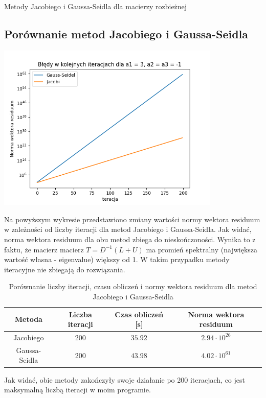\documentclass{article}
\begin{document}
\begin{section}{Metody Jacobiego i Gaussa-Seidla dla macierzy rozbieżnej}
    \subsection{Porównanie metod Jacobiego i Gaussa-Seidla}
    \begin{center}
        \includegraphics[width=0.8\textwidth]{bledy_rozbiezne.png}
    \end{center}
    Na powyższym wykresie przedstawiono zmiany wartości normy wektora residuum w zależności od liczby iteracji
    dla metod Jacobiego i Gaussa-Seidla. Jak widać, norma wektora residuum dla obu metod zbiega do nieskończoności.
    Wynika to z faktu, że macierz macierz $T = D^{-1}(L + U)$ ma promień spektralny (największa wartość własna - eigenvalue)
    większy od 1\cite{wyklad3}. W takim przypadku metody iteracyjne nie zbiegają do rozwiązania.

    \begin{table}[H]
        \centering
        \begin{tabular}{|c|c|c|c|}
            \hline
            Metoda & Liczba iteracji & Czas obliczeń [s] & Norma wektora residuum \\
            \hline
            Jacobiego & $200$ & $35.92$ & $2.94\cdot10^{26}$ \\
            Gaussa-Seidla & $200$ & $43.98$ & $4.02\cdot10^{61}$ \\
            \hline
        \end{tabular}
        \caption{Porównanie liczby iteracji, czasu obliczeń i normy wektora residuum dla metod Jacobiego i Gaussa-Seidla}
    \end{table}
    Jak widać, obie metody zakończyły swoje działanie po 200 iteracjach, co jest maksymalną liczbą iteracji w moim programie.

\end{section}
\end{document}
